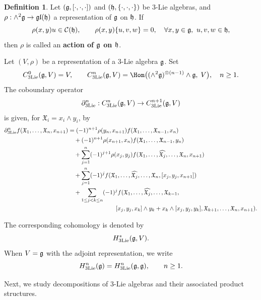 \documentclass[12pt]{amsart}
\theoremstyle{definition}
\newtheorem{defn}[theorem]{Definition}
\begin{document}
\begin{defn}
	Let $(\frak g,[\cdot,\cdot,\cdot])$ and $(\frak h,\{\cdot,\cdot,\cdot\})$ be $3$-Lie algebras, and
	$\rho:\wedge^{2}\frak g\to\mathfrak{gl}(\frak h)$ a representation of $\frak g$ on $\frak h$.
	If
	\[
	\rho(x,y)u\in\mathcal C(\frak h),\qquad
	\rho(x,y)\{u,v,w\}=0,
	\quad
	\forall x,y\in\frak g,\ u,v,w\in\frak h,
	\]
	then $\rho$ is called an \textbf{action of $\frak g$ on $\frak h$}.
\end{defn}

\smallskip
Let $(V,\rho)$ be a representation of a $3$-Lie algebra $\frak g$.
Set
\[
C^0_{\mathrm{3Lie}}(\frak g,V)=V,\qquad
C^n_{\mathrm{3Lie}}(\frak g,V)=
\Hom\big((\wedge^{2}\frak g)^{\otimes(n-1)}\wedge\frak g,\;V\big),\quad n\ge1.
\]
The coboundary operator
\[
\partial_{\mathrm{3Lie}}^n:C^n_{\mathrm{3Lie}}(\frak g,V)\to C^{n+1}_{\mathrm{3Lie}}(\frak g,V)
\]
is given, for $\mathfrak X_i=x_i\wedge y_i$, by
\[
\begin{split}
	\partial_{\mathrm{3Lie}}^n f(\mathfrak X_1,\ldots,\mathfrak X_n,x_{n+1})
	&=(-1)^{n+1}\rho(y_n,x_{n+1})f(\mathfrak X_1,\ldots,\mathfrak X_{n-1},x_n)\\
	&\quad+(-1)^{n+1}\rho(x_{n+1},x_n)f(\mathfrak X_1,\ldots,\mathfrak X_{n-1},y_n)\\
	&\quad+\sum_{j=1}^n(-1)^{j+1}\rho(x_j,y_j)
	f(\mathfrak X_1,\ldots,\widehat{\mathfrak X_j},\ldots,\mathfrak X_n,x_{n+1})\\
	&\quad+\sum_{j=1}^n(-1)^j
	f(\mathfrak X_1,\ldots,\widehat{\mathfrak X_j},\ldots,\mathfrak X_n,[x_j,y_j,x_{n+1}])\\
	&\quad+\sum_{1\le j<k\le n}(-1)^j
	f(\mathfrak X_1,\ldots,\widehat{\mathfrak X_j},\ldots,\mathfrak X_{k-1},\\
	&\hspace{2.8cm}
	[x_j,y_j,x_k]\wedge y_k+x_k\wedge[x_j,y_j,y_k],\mathfrak X_{k+1},\ldots,\mathfrak X_n,x_{n+1}).
\end{split}
\]

The corresponding cohomology is denoted by
\[
H^*_{\mathrm{3Lie}}(\frak g,V).
\]
When $V=\frak g$ with the adjoint representation, we write
\[
H^n_{\mathrm{3Lie}}(\frak g)=H^n_{\mathrm{3Lie}}(\frak g,\frak g),\qquad n\ge1.
\]


Next, we study decompositions of $3$-Lie algebras and their associated product structures.
	
\end{document}
